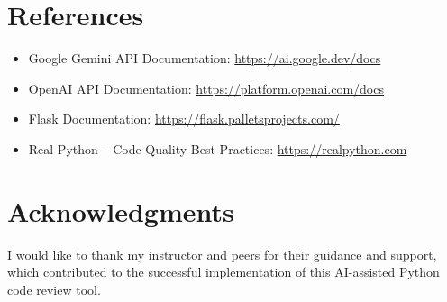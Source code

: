 \documentclass[12pt]{article}
\begin{document}
\section*{References}

\begin{itemize}
    \item Google Gemini API Documentation: \url{https://ai.google.dev/docs}
    \item OpenAI API Documentation: \url{https://platform.openai.com/docs}
    \item Flask Documentation: \url{https://flask.palletsprojects.com/}
    \item Real Python -- Code Quality Best Practices: \url{https://realpython.com}
\end{itemize}

\section*{Acknowledgments}

I would like to thank my instructor and peers for their guidance and support, which contributed to the successful implementation of this AI-assisted Python code review tool.
\end{document}
